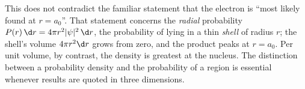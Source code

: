\begin{insightbox}
This does not contradict the familiar statement that the electron is ``most likely found at $r=a_0$''. That statement concerns the \emph{radial} probability $P(r)\,\d r=4\pi r^2|\psi|^2\,\d r$, the probability of lying in a thin \emph{shell} of radius $r$; the shell's volume $4\pi r^2\d r$ grows from zero, and the product peaks at $r=a_0$. Per unit volume, by contrast, the density is greatest at the nucleus. The distinction between a probability density and the probability of a region is essential whenever results are quoted in three dimensions.
\end{insightbox}
